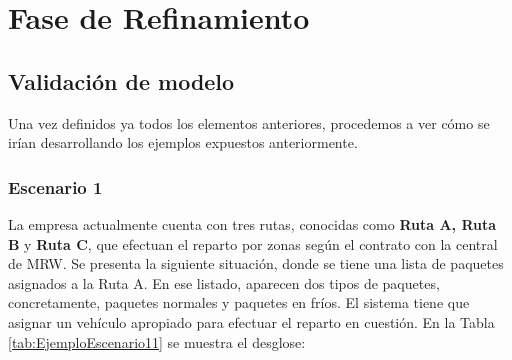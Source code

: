 \section{Fase de Refinamiento}

\subsection{Validación de modelo}

Una vez definidos ya todos los elementos anteriores, procedemos a ver cómo se irían desarrollando los ejemplos expuestos anteriormente.

\subsubsection{Escenario 1}

La empresa actualmente cuenta con tres rutas, conocidas como \textbf{Ruta A, Ruta B} y \textbf{Ruta C}, que efectuan el reparto por zonas según el contrato con la central de MRW. Se presenta la siguiente situación, donde se tiene una lista de paquetes asignados a la Ruta A. En ese listado, aparecen dos tipos de paquetes, concretamente, paquetes normales y paquetes en fríos. El sistema tiene que asignar un vehículo apropiado para efectuar el reparto en cuestión. En la Tabla \ref{tab:EjemploEscenario11} se muestra el desglose:

